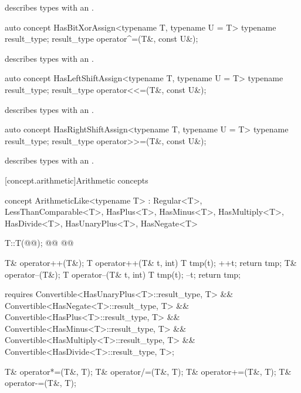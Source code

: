 \documentclass[american,twoside]{book}
\begin{document}
\begin{itemdescr}
\pnum
\mbox{\reallynote} describes types with an \mbox{}.
\end{itemdescr}

\begin{itemdecl}
auto concept HasBitXorAssign<typename T, typename U = T> {
  typename result_type;
  result_type operator^=(T&, const U&);
}
\end{itemdecl}

\begin{itemdescr}
\pnum
\mbox{\reallynote} describes types with an \mbox{}.
\end{itemdescr}

\begin{itemdecl}
auto concept HasLeftShiftAssign<typename T, typename U = T> {
  typename result_type;
  result_type operator<<=(T&, const U&);
}
\end{itemdecl}

\begin{itemdescr}
\pnum
\mbox{\reallynote} describes types with an \mbox{}.
\end{itemdescr}

\begin{itemdecl}
auto concept HasRightShiftAssign<typename T, typename U = T> {
  typename result_type;
  result_type operator>>=(T&, const U&);
}
\end{itemdecl}

\begin{itemdescr}
\pnum
\mbox{\reallynote} describes types with an \mbox{}.
\end{itemdescr}

[concept.arithmetic]{Arithmetic concepts}

\begin{itemdecl}
concept ArithmeticLike<typename T> 
  : Regular<T>, LessThanComparable<T>, HasPlus<T>, HasMinus<T>, HasMultiply<T>, HasDivide<T>, 
    HasUnaryPlus<T>, HasNegate<T> {
  T::T(@@);
  @@
  @@

  T& operator++(T&);
  T operator++(T& t, int) { T tmp(t); ++t; return tmp; }
  T& operator--(T&);
  T operator--(T& t, int) { T tmp(t); --t; return tmp; }

  requires Convertible<HasUnaryPlus<T>::result_type, T>
        && Convertible<HasNegate<T>::result_type, T>
        && Convertible<HasPlus<T>::result_type, T>
        && Convertible<HasMinus<T>::result_type, T>
        && Convertible<HasMultiply<T>::result_type, T>
        && Convertible<HasDivide<T>::result_type, T>;

  T& operator*=(T&, T);
  T& operator/=(T&, T);
  T& operator+=(T&, T);
  T& operator-=(T&, T);
}
\end{itemdecl}
\end{document}
